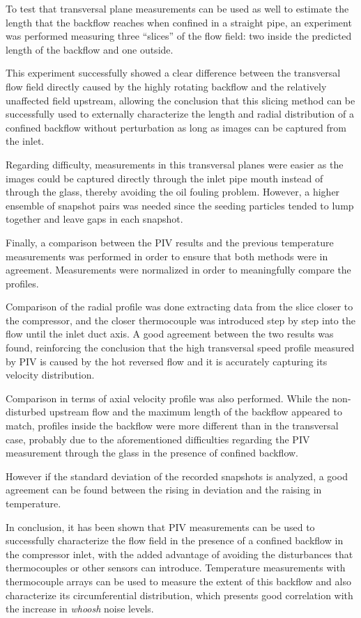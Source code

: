 To test that transversal plane measurements can be used as well to estimate the length that the backflow reaches when confined in a straight pipe, an experiment was performed measuring three ``slices'' of the flow field: two inside the predicted length of the backflow and one outside.

This experiment successfully showed a clear difference between the transversal flow field directly caused by the highly rotating backflow and the relatively unaffected field upstream, allowing the conclusion that this slicing method can be successfully used to externally characterize the length and radial distribution of a confined backflow without perturbation as long as images can be captured from the inlet.

Regarding difficulty, measurements in this transversal planes were easier as the images could be captured directly through the inlet pipe mouth instead of through the glass, thereby avoiding the oil fouling problem. However, a higher ensemble of snapshot pairs was needed since the seeding particles tended to lump together and leave gaps in each snapshot.

Finally, a comparison between the PIV results and the previous temperature measurements was performed in order to ensure that both methods were in agreement. Measurements were normalized in order to meaningfully compare the profiles.

Comparison of the radial profile was done extracting data from the slice closer to the compressor, and the closer thermocouple was introduced step by step into the flow until the inlet duct axis. A good agreement between the two results was found, reinforcing the conclusion that the high transversal speed profile measured by PIV is caused by the hot reversed flow and it is accurately capturing its velocity distribution.

Comparison in terms of axial velocity profile was also performed. While the non-disturbed upstream flow and the maximum length of the backflow appeared to match, profiles inside the backflow were more different than in the transversal case, probably due to the aforementioned difficulties regarding the PIV measurement through the glass in the presence of confined backflow.

However if the standard deviation of the recorded snapshots is analyzed, a good agreement can be found between the rising in deviation and the raising in temperature.

In conclusion, it has been shown that PIV measurements can be used to successfully characterize the flow field in the presence of a confined backflow in the compressor inlet, with the added advantage of avoiding the disturbances that thermocouples or other sensors can introduce. Temperature measurements with thermocouple arrays can be used to measure the extent of this backflow and also characterize its circumferential distribution, which presents good correlation with the increase in \emph{whoosh} noise levels.

